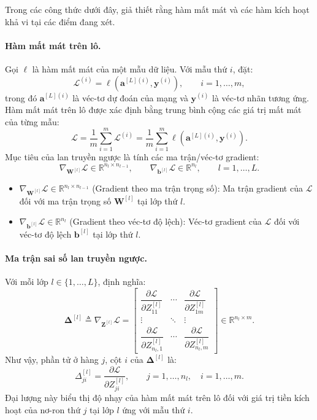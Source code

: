 Trong các công thức dưới đây, giả thiết rằng hàm mất mát và các hàm kích hoạt khả vi tại các điểm đang xét. 
\paragraph{Hàm mất mát trên lô.\\}
Gọi $\ell$ là hàm mất mát của một mẫu dữ liệu. Với mẫu thứ $i$, đặt:
\[\mathcal{L}^{(i)}
=\ell\!\left(\mathbf{a}^{[L](i)},\mathbf{y}^{(i)}\right),
\qquad i=1,\ldots,m,\]
trong đó $\mathbf{a}^{[L](i)}$ là véc-tơ dự đoán của mạng và
$\mathbf{y}^{(i)}$ là véc-tơ nhãn tương ứng. Hàm mất mát trên lô được xác định bằng trung bình cộng các giá trị mất mát của từng mẫu:
\begin{equation}
    \label{eq:bpb_loss}
    \mathcal{L}
    =\frac{1}{m}\sum_{i=1}^{m}\mathcal{L}^{(i)}
    =\frac{1}{m}\sum_{i=1}^{m}
    \ell\!\left(\mathbf{a}^{[L](i)},\mathbf{y}^{(i)}\right).
\end{equation}
Mục tiêu của lan truyền ngược là tính các ma trận/véc-tơ gradient:
\begin{equation}
\label{eq:bpb_goal}
\nabla_{\mathbf{W}^{[l]}}\mathcal{L}
\in\mathbb{R}^{n_l\times n_{l-1}},
\qquad
\nabla_{\mathbf{b}^{[l]}}\mathcal{L}
\in\mathbb{R}^{n_l},
\qquad l=1,\ldots,L.
\end{equation}
\begin{itemize}
    \item $\nabla_{\mathbf{W}^{[l]}}\mathcal{L} \in \mathbb{R}^{n_l\times n_{l-1}}$ (Gradient theo ma trận trọng số): Ma trận gradient của $\mathcal{L}$ đối với ma trận trọng số $\mathbf{W}^{[l]}$ tại lớp thứ $l$.
    \item $\nabla_{\mathbf{b}^{[l]}}\mathcal{L} \in \mathbb{R}^{n_l}$ (Gradient theo véc-tơ độ lệch): Véc-tơ gradient của $\mathcal{L}$ đối với véc-tơ độ lệch $\mathbf{b}^{[l]}$ tại lớp thứ $l$.
\end{itemize}

\paragraph{Ma trận sai số lan truyền ngược.\\}
Với mỗi lớp $l\in\{1,\ldots,L\}$, định nghĩa:
\begin{equation}
\label{eq:bpb_delta_def}
\boldsymbol{\Delta}^{[l]}
\triangleq\nabla_{\mathbf{Z}^{[l]}}\mathcal{L}
=\begin{bmatrix}
\dfrac{\partial\mathcal{L}}{\partial Z_{11}^{[l]}}
&\cdots&
\dfrac{\partial\mathcal{L}}{\partial Z_{1m}^{[l]}}\\[8pt]
\vdots&\ddots&\vdots\\[4pt]
\dfrac{\partial\mathcal{L}}{\partial Z_{n_l,1}^{[l]}}
&\cdots&
\dfrac{\partial\mathcal{L}}{\partial Z_{n_l,m}^{[l]}}
\end{bmatrix}
\in\mathbb{R}^{n_l\times m}.
\end{equation}
Như vậy, phần tử ở hàng $j$, cột $i$ của
$\boldsymbol{\Delta}^{[l]}$ là:
\[\Delta_{ji}^{[l]}
=\frac{\partial\mathcal{L}}{\partial Z_{ji}^{[l]}},
\qquad j=1,\ldots,n_l,\quad i=1,\ldots,m.\]
Đại lượng này biểu thị độ nhạy của hàm mất mát trên lô đối với giá trị tiền kích hoạt của nơ-ron thứ $j$ tại lớp $l$ ứng với mẫu thứ $i$.

